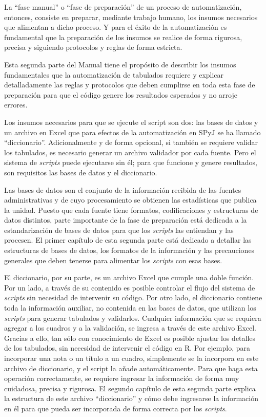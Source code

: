 \documentclass[
  spanish,
]{book}
\begin{document}
La ``fase manual'' o ``fase de preparación'' de un proceso de automatización, entonces, consiste en preparar, mediante trabajo humano, los insumos necesarios que alimentan a dicho proceso. Y para el éxito de la automatización es fundamental que la preparación de los insumos se realice de forma rigurosa, precisa y siguiendo protocolos y reglas de forma estricta.

Esta segunda parte del Manual tiene el propósito de describir los insumos fundamentales que la automatización de tabulados requiere y explicar detalladamente las reglas y protocolos que deben cumplirse en toda esta fase de preparación para que el código genere los resultados esperados y no arroje errores.

Los insumos necesarios para que se ejecute el script son dos: las bases de datos y un archivo en Excel que para efectos de la automatización en SPyJ se ha llamado ``diccionario''. Adicionalmente y de forma opcional, si también se requiere validar los tabulados, es necesario generar un archivo validador por cada fuente. Pero el sistema de \emph{scripts} puede ejecutarse sin él; para que funcione y genere resultados, son requisitos las bases de datos y el diccionario.

Las bases de datos son el conjunto de la información recibida de las fuentes administrativas y de cuyo procesamiento se obtienen las estadísticas que publica la unidad. Puesto que cada fuente tiene formatos, codificaciones y estructuras de datos distintos, parte importante de la fase de preparación está dedicada a la estandarización de bases de datos para que los \emph{scripts} las entiendan y las procesen. El primer capítulo de esta segunda parte está dedicado a detallar las estructuras de bases de datos, los formatos de la información y las precauciones generales que deben tenerse para alimentar los \emph{scripts} con esas bases.

El diccionario, por su parte, es un archivo Excel que cumple una doble función. Por un lado, a través de su contenido es posible controlar el flujo del sistema de \emph{scripts} sin necesidad de intervenir su código. Por otro lado, el diccionario contiene toda la información auxiliar, no contenida en las bases de datos, que utilizan los \emph{scripts} para generar tabulados y validarlos. Cualquier información que se requiera agregar a los cuadros y a la validación, se ingresa a través de este archivo Excel. Gracias a ello, tan sólo con conocimiento de Excel es posible ajustar los detalles de los tabulados, sin necesidad de intervenir el código en R. Por ejemplo, para incorporar una nota o un título a un cuadro, simplemente se la incorpora en este archivo de diccionario, y el script la añade automáticamente. Para que haga esta operación correctamente, se requiere ingresar la información de forma muy cuidadosa, precisa y rigurosa. El segundo capítulo de esta segunda parte explica la estructura de este archivo ``diccionario'' y cómo debe ingresarse la información en él para que pueda ser incorporada de forma correcta por los \emph{scripts}.
\end{document}
